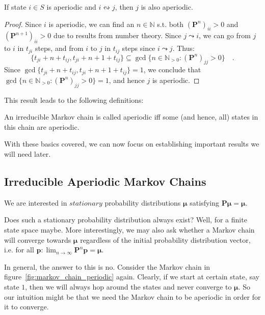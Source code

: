 \documentclass[../../main.tex]{subfiles}
\begin{document}
\begin{lemma}
    If state $i \in S$ is aperiodic and $i \leftrightsquigarrow j$, then $j$ is also aperiodic.
\end{lemma}
\vspace{-2.5em}
\begin{proof}
    Since $i$ is aperiodic, we can find an $n \in \mathbb{N}$ s.t. both $(\bm{P}^n)_{ii} > 0$ and $(\bm{P}^{n+1})_{ii} > 0$ due to results from number theory. Since $j \leadsto i$, we can go from $j$ to $i$ in $t_{ji}$ steps, and from $i$ to $j$ in $t_{ij}$ steps since $i \leadsto j$. Thus:
    \[
        \{ t_{ji} + n + t_{ij}, t_{ji} + n + 1 + t_{ij} \} \subseteq \gcd \{ n \in \mathbb{N}_{>0} : (\bm{P}^n)_{jj} > 0 \} \quad .
    \]
    Since $\gcd \{ t_{ji} + n + t_{ij}, t_{ji} + n + 1 + t_{ij} \} = 1$, we conclude that $\gcd \{ n \in \mathbb{N}_{>0} : (\bm{P}^n)_{jj} > 0 \} = 1$, and hence $j$ is aperiodic.
\end{proof}

This result leads to the following definitions:

\begin{definition}
    An irreducible Markov chain is called aperiodic iff some (and hence, all) states in this chain are aperiodic.   
\end{definition}

With these basics covered, we can now focus on establishing important results we will need later.

\subsection{Irreducible Aperiodic Markov Chains}
We are interested in $stationary$ probability distributions $\bm{\mu}$ satisfying $\bm{P \mu} = \bm{\mu}$.

Does such a stationary probability distribution always exist? Well, for a finite state space maybe. More interestingly, we may also ask whether a Markov chain will converge towards $\bm{\mu}$ regardless of the initial probability distribution vector, i.e. for all $\bm{p}: \lim_{n \to \infty} \bm{P}^n \bm{p} = \bm{\mu} $.

In general, the answer to this is no. Consider the Markov chain in figure~\ref{fig:markov_chain_periodic} again. Clearly, if we start at certain state, say state $1$, then we will always hop around the states and never converge to $\bm{\mu}$. So our intuition might be that we need the Markov chain to be aperiodic in order for it to converge.
\end{document}
